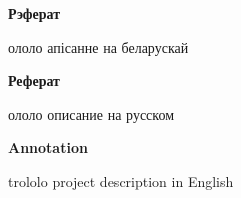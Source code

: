 \begin{center}
    {\bf Рэферат}
\end{center}

ололо апісанне на беларускай

\begin{center}
    {\bf Реферат}
\end{center}

ололо описание на русском

\begin{center}
    {\bf Annotation}
\end{center}

trololo project description in English

\newpage